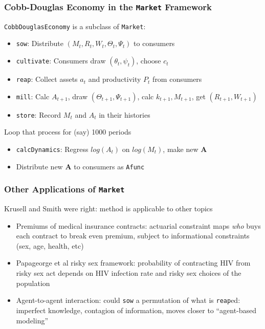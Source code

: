 \documentclass[11pt,handout]{beamer}
\newcommand{\bi}{\begin{itemize}}
\newcommand{\ei}{\end{itemize}}
\begin{document}
\begin{frame}
\frametitle{Cobb-Douglas Economy in the \texttt{Market} Framework}

\texttt{CobbDouglasEconomy} is a subclass of \texttt{Market}:

\bi
\item \texttt{sow}: Distribute $(M_t,R_t,W_t,\Theta_t,\Psi_t)$ to consumers

\item \texttt{cultivate}: Consumers draw $(\theta_t,\psi_t)$, choose $c_t$

\item \texttt{reap}: Collect assets $a_t$ and productivity $P_t$ from consumers

\item \texttt{mill}: Calc $A_{t+1}$, draw $(\Theta_{t+1},\Psi_{t+1})$, calc $k_{t+1}, M_{t+1}$, get $(R_{t+1},W_{t+1})$

\item \texttt{store}: Record $M_t$ and $A_t$ in their histories
\ei

Loop that process for (say) 1000 periods
\begin{itemize}
\item \texttt{calcDynamics}: Regress $log(A_t)$ on $log(M_t)$, make new \textbf{A}

\item Distribute new \textbf{A} to consumers as \texttt{Afunc}
\end{itemize}
\end{frame}



\begin{frame}
\frametitle{Other Applications of \texttt{Market}}
Krusell and Smith were right: method is applicable to other topics

\bi
\item <1->Premiums of medical insurance contracts: actuarial constraint maps \textit{who} buys each contract to break even premium, subject to informational constraints (sex, age, health, etc)

\item <2->Papageorge et al risky sex framework: probability of contracting HIV from risky sex act depends on HIV infection rate and risky sex choices of the population

\item <3->Agent-to-agent interaction: could \texttt{sow} a permutation of what is \texttt{reap}ed: imperfect knowledge, contagion of information, moves closer to ``agent-based modeling''
\ei
\end{frame}
\end{document}
